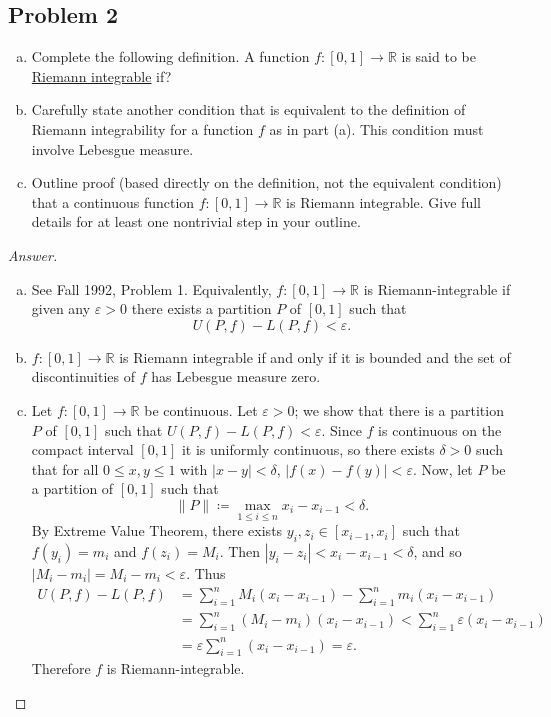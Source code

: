 \documentclass[12pt]{article}
\newcommand{\real}{\mathbb{R}}
\newcommand\paren[1]{\left( #1 \right)}
\newcommand{\sqbrack}[1]{\left [ #1 \right ]}
\newcommand{\eps}{\varepsilon}
\theoremstyle{definition}
\begin{document}
\subsection{Problem 2 \texorpdfstring{\cite{PZ}}{}}
\begin{enumerate}[a.]
    \item Complete the following definition. A function $f : [0,1] \to \real$ is said to be \underline{Riemann integrable} if?
    \item Carefully state another condition that is equivalent to the definition of Riemann integrability for a function $f$ as in part (a). This condition must involve Lebesgue measure.
    \item Outline  proof (based directly on the definition, not the equivalent condition) that a continuous function $f : [0,1] \to \real$ is Riemann integrable. Give full details for at least one nontrivial step in your outline.
\end{enumerate}
\begin{proof}[Answer]
    \noindent
    \begin{enumerate}[a.]
        \item See Fall 1992, Problem 1. Equivalently, $f : [0,1] \to \real$ is Riemann-integrable if given any $\eps > 0$ there exists a partition $P$ of $[0,1]$ such that 
        \[
            U(P,f) - L(P,f) < \eps.
        \]
        \item $f : [0,1] \to \real$ is Riemann integrable if and only if it is bounded and the set of discontinuities of $f$ has Lebesgue measure zero.
        \item Let $f : [0,1] \to \real$ be continuous. Let $\eps > 0$; we show that there is a partition $P$ of $[0,1]$ such that $U(P,f) - L(P,f) < \eps$. Since $f$ is continuous on the compact interval $[0,1]$ it is uniformly continuous, so there exists $\delta > 0$ such that for all $0 \leq x , y \leq 1$ with $|x - y| < \delta$, $|f(x) - f(y)| < \eps$. Now, let $P$ be a partition of $[0,1]$ such that 
        \[
            \| P \| \coloneqq \max\limits_{1 \leq i \leq n} x_{i} - x_{i-1} < \delta.        
        \]
        By Extreme Value Theorem, there exists $y_i , z_i \in \sqbrack{x_{i-1},x_i}$ such that $f(y_i) = m_i$ and $f(z_i) = M_i$. Then $|y_i - z_i| < x_{i} - x_{i-1} < \delta$, and so $|M_i - m_i| = M_i - m_i < \eps$. Thus 
        \begin{align*}
            U(P,f) - L(P,f) & = \sum\limits_{i = 1}^n M_i \paren{ x_{i} - x_{i-1} } - \sum\limits_{i = 1}^n m_i \paren{ x_{i} - x_{i-1} } \\
            & = \sum\limits_{i = 1}^n \paren{ M_i - m_i } \paren{ x_{i} - x_{i-1} } < \sum\limits_{i = 1}^n \eps \paren{ x_{i} - x_{i-1} } \\
            & = \eps \sum\limits_{i = 1}^n \paren{ x_{i} - x_{i-1} } = \eps.
        \end{align*}
        Therefore $f$ is Riemann-integrable.
    \end{enumerate}
\end{proof}
\end{document}
